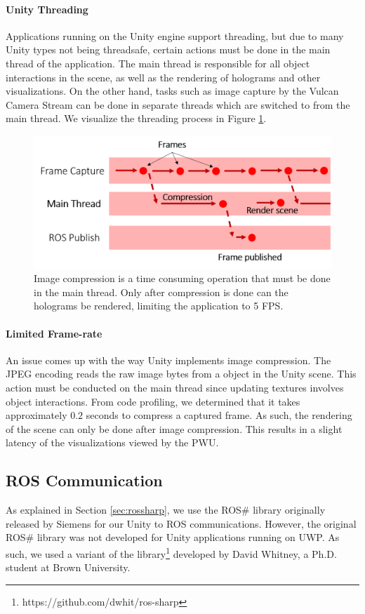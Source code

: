 \paragraph{Unity Threading} Applications running on the Unity engine support threading, but due to many Unity types not being threadsafe, certain actions must be done in the main thread of the application. The main thread is responsible for all object interactions in the scene, as well as the rendering of holograms and other visualizations. On the other hand, tasks such as image capture by the Vulcan Camera Stream can be done in separate threads which are switched to from the main thread. We visualize the threading process in Figure \ref{fig:unityThreads}.

\begin{figure}[ht]
    \centering
    \includegraphics[width=0.8\linewidth]{img/chapter5_implementation/unityThreads.png}
    \caption{Image compression is a time consuming operation that must be done in the main thread. Only after compression is done can the holograms be rendered, limiting the application to 5 FPS.}
    \label{fig:unityThreads}
\end{figure}

\paragraph{Limited Frame-rate} An issue comes up with the way Unity implements image compression. The JPEG encoding reads the raw image bytes from a  object in the Unity scene. This action must be conducted on the main thread since updating textures involves object interactions. From code profiling, we determined that it takes approximately $0.2$ seconds to compress a captured frame. As such, the rendering of the scene can only be done after image compression. This results in a slight latency of the visualizations viewed by the PWU. 

\subsection{ROS Communication}
As explained in Section \ref{sec:rossharp}, we use the ROS\# library originally released by Siemens for our Unity to ROS communications. However, the original ROS\# library was not developed for Unity applications running on UWP. As such, we used a variant of the library\footnote{https://github.com/dwhit/ros-sharp} developed by David Whitney, a Ph.D. student at Brown University. 

